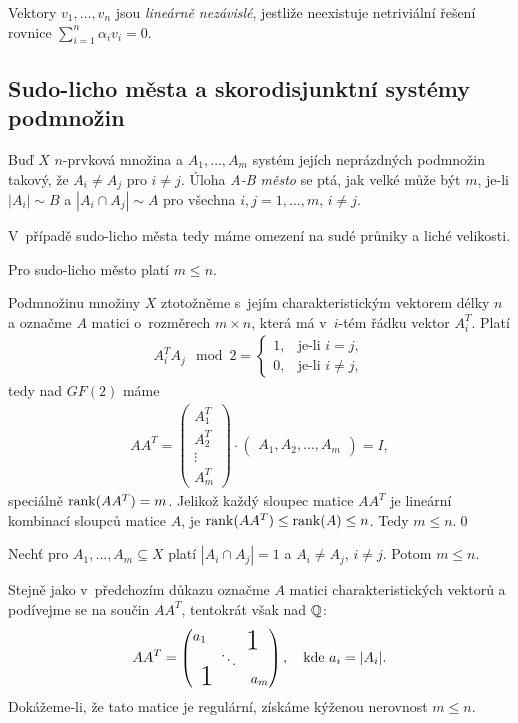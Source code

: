 \df Vektory $v_1,\dots,v_n$ jsou {\it lineárně nezávislé}, jestliže neexistuje netriviální řešení 
rovnice $\sum_{i=1}^n \alpha_iv_i=0$.

\medskip
\subsection{Sudo-licho města a skorodisjunktní systémy podmnožin}


\df Buď $X$ $n$-prvková množina a $A_1,\dots,A_m$ systém jejích neprázdných podmnožin takový, že $A_i \ne A_j$ pro $i\neq j$. Úloha {\it A-B město} se ptá, jak velké může být $m$, je-li $|A_i|\sim B$ a $|A_i\cap A_j|\sim A$ pro všechna $i,j=1,\dots,m$, $i\neq j$.

\medskip
V~případě sudo-licho města tedy máme omezení na sudé průniky a liché velikosti.

\vt Pro sudo-licho město platí $m \leq n$.

\dk Podmnožinu množiny $X$ ztotožněme s~jejím charakteristickým vektorem délky $n$ a označme $A$ matici o~rozměrech $m\times n$, která má v~$i$-tém řádku vektor $A_i^T$. Platí
\begin{align}
A_i^TA_j\!\mod2=\begin{cases}1,&\text{je-li }i=j,\\0,&\text{je-li }i\neq j,\end{cases}
\end{align}
tedy nad $GF(2)$ máme
\begin{align}
	AA^T = \left(\begin{matrix}A_1^T\\ A_2^T \\ \vdots \\ A_m^T \end{matrix}\right) 
	\cdot \left(\begin{matrix}A_1, A_2, \dots, A_m\end{matrix}\right) = I,
\end{align}
speciálně $\operatorname{rank}(AA^T) = m$. Jelikož každý sloupec matice $AA^T$ je lineární kombinací sloupců matice $A$, je $\operatorname{rank}(AA^T)\leq\operatorname{rank}(A)\leq n$. Tedy $m\leq n$.\qed

\vt Nechť pro $A_1,\dots,A_m\subseteq X$ platí $|A_i \cap A_j| = 1 $ a $A_i \neq A_j$, $i\neq j$. Potom $m \leq n$.

\dk Stejně jako v~předchozím důkazu označme $A$ matici charakteristických vektorů a podívejme se na součin $AA^T$, tentokrát však nad $\mathbb{Q}$:
\begin{align}
	AA^T = \left(\begin{matrix}
	a_1&&\smash{\bigone\quad}\\
	&\ddots&\\
	\smash{\quad\raisebox{5pt}{\bigone}}&&a_m
	\end{matrix}\right),\quad\text{kde }a_i=|A_i|. 
\end{align}
Dokážeme-li, že tato matice je regulární, získáme kýženou nerovnost $m\leq n$.

